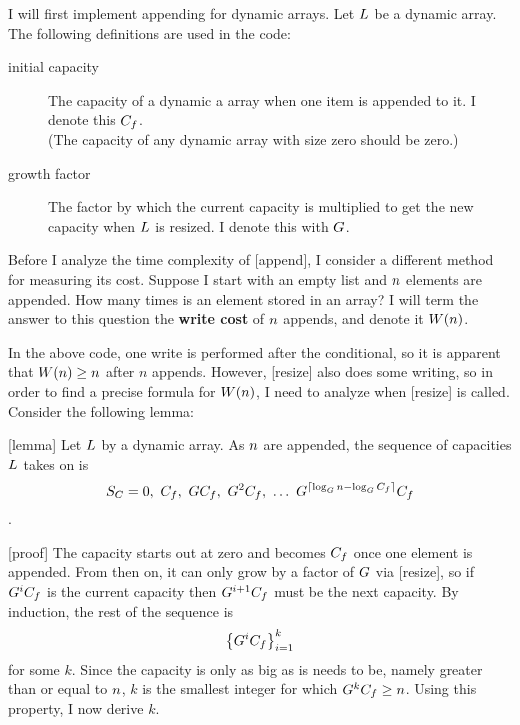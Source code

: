 \dynarrayimpl

I will first implement appending for dynamic arrays. Let $L$ be a dynamic array. The following definitions are used in the code:

\begin{description}
	\item[initial capacity] The capacity of a dynamic a array when one item is appended to it. I denote this $C_f$.\\
	(The capacity of any dynamic array with size zero should be zero.)
	\item[growth factor] The factor by which the current capacity is multiplied to get the new capacity when $L$ is resized. I denote this with $G$.
\end{description}

\begin{algorithm}
	\begin{algorithmic}
		\State
	\end{algorithmic}
\end{algorithm}

\tcomplex

Before I analyze the time complexity of [append], I consider a different method for measuring its cost. Suppose I start with an empty list and $n$ elements are appended. How many times is an element stored in an array? I will term the answer to this question the \textbf{write cost} of $n$ appends, and denote it $W(n)$.

In the above code, one write is performed after the conditional, so it is apparent that $W(n) \geq n$ after $n$ appends. However, [resize] also does some writing, so in order to find a precise formula for $W(n)$, I need to analyze when [resize] is called. Consider the following lemma:

[lemma]
Let $L$ by a dynamic array. As $n$ are appended, the sequence of capacities $L$ takes on is $$S_C = 0,\ \initcapacity,\ \growthfactor\initcapacity,\ \growthfactor^2\initcapacity,\ \ldots\ \growthfactor^{\lceil \log_{\growthfactor} \varnitems - \log_{\growthfactor} \initcapacity \rceil}\initcapacity$$.

[proof]
The capacity starts out at zero and becomes $C_f$ once one element is appended. From then on, it can only grow by a factor of $G$ via [resize], so if $G^iC_f$ is the current capacity then $G^{i + 1}C_f$ must be the next capacity. By induction, the rest of the sequence is $$\left\{ G^iC_f \right\}_{i = 1}^k$$ for some $k$. Since the capacity is only as big as is needs to be, namely greater than or equal to $n$, $k$ is the smallest integer for which $G^kC_f \geq n$. Using this property, I now derive $k$.

